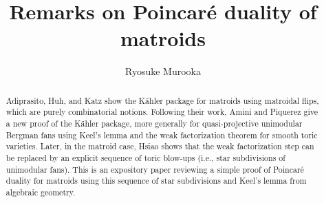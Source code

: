 \documentclass[a4paper,final,oneside]{amsart}
\title{
Remarks on Poincar\'e duality of matroids
}
\author{
Ryosuke Murooka \\
}
\date{}
\theoremstyle{definition}
\theoremstyle{plain}
\theoremstyle{remark}
\begin{document}
\begin{abstract}
Adiprasito, Huh, and Katz show the K\"ahler package for matroids using matroidal flips, which are purely combinatorial notions.
Following their work, Amini and Piquerez give a new proof of the K\"ahler package, more generally for quasi-projective unimodular Bergman fans using Keel's lemma and the weak factorization theorem for smooth toric varieties.
Later, in the matroid case, Hsiao shows that the weak factorization step can be replaced by an explicit sequence of toric blow-ups (i.e., star subdivisions of unimodular fans).
This is an expository paper reviewing a simple proof of Poincar\'e duality for matroids using this sequence of star subdivisions and Keel's lemma from algebraic geometry.
\end{abstract}
\maketitle
\end{document}
